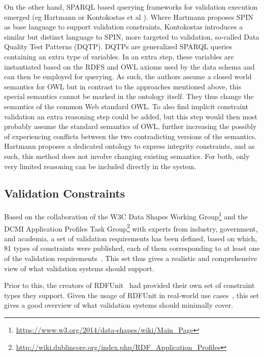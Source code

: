 On the other hand, SPARQL based querying frameworks for validation execution emerged (eg Hartmann \cite{hartmann2016} or Kontokostas et al \cite{kontokostas2014test}).
Where Hartmann proposes SPIN as base language to support validation constraints, Kontokostas introduces a similar but distinct language to SPIN,
more targeted to validation, so-called Data Quality Test Patterns (DQTP). 
DQTPs are generalized  SPARQL queries containing an extra type of variables. In an extra step, these variables are instantiated based on the  RDFS and OWL axioms used
by the data schema and can then be employed for querying. 
As such, the authors assume a closed world semantics for OWL
but in contrast to the approaches mentioned above,
this special semantics cannot be marked in the ontology itself.
They thus change the semantics of the common Web standard OWL.
To also find implicit constraint validation an extra reasoning step could be added,
but this step would then most probably assume the standard semantics of OWL,
further increasing the possibly of experiencing conflicts between the two contradicting versions of the semantics.
Hartmann proposes a dedicated ontology
to express integrity constraints, and as such,
this method does not involve changing existing semantics.
For both, only very limited reasoning can be included directly in the system.



\subsection{\rdf Validation Constraints}\label{cons}


Based on the collaboration of
the W3C \rdf Data Shapes Working Group\footnote{\url{https://www.w3.org/2014/data-shapes/wiki/Main_Page}} and
the DCMI \rdf Application Profiles Task Group\footnote{\url{http://wiki.dublincore.org/index.php/RDF_Application_Profiles}}
with experts from industry, government, and academia,
a set of validation requirements has been defined,
based on which,
81 types of constraints were published,
each of them corresponding to at least one of the validation requirements~\cite{bosch2015rdf}.
This set thus gives a realistic and comprehensive view of what validation systems should support. 


Prior to this, the creators of RDFUnit~\cite{kontokostas2014test} had provided their own set of constraint types they support.
Given the usage of RDFUnit in real-world use cases~\cite{jurion_rdfunit},
this set gives a good overview
of what validation systems should minimally cover.


